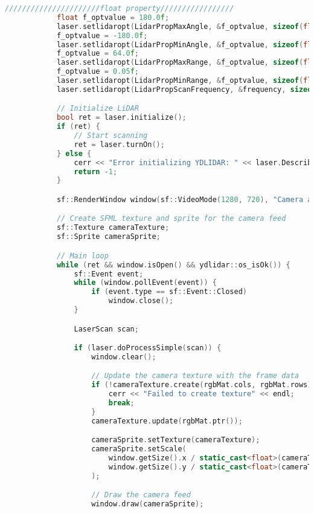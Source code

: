 \begin{lstlisting}[language={C++}, caption={C\'odigo de ejemplo de Kinect y LiDAR}, label={fresd}]
            //////////////////////float property/////////////////
            float f_optvalue = 180.0f;
            laser.setlidaropt(LidarPropMaxAngle, &f_optvalue, sizeof(float));
            f_optvalue = -180.0f;
            laser.setlidaropt(LidarPropMinAngle, &f_optvalue, sizeof(float));
            f_optvalue = 64.0f;
            laser.setlidaropt(LidarPropMaxRange, &f_optvalue, sizeof(float));
            f_optvalue = 0.05f;
            laser.setlidaropt(LidarPropMinRange, &f_optvalue, sizeof(float));
            laser.setlidaropt(LidarPropScanFrequency, &frequency, sizeof(float));

            // Initialize LiDAR
            bool ret = laser.initialize();
            if (ret) {
                // Start scanning
                ret = laser.turnOn();
            } else {
                cerr << "Error initializing YDLIDAR: " << laser.DescribeError() << endl;
                return -1;
            }

            sf::RenderWindow window(sf::VideoMode(1280, 720), "Camera and LiDAR Visualization");

            // Create SFML texture and sprite for the camera feed
            sf::Texture cameraTexture;
            sf::Sprite cameraSprite;

            // Main loop
            while (ret && window.isOpen() && ydlidar::os_isOk()) {
                sf::Event event;
                while (window.pollEvent(event)) {
                    if (event.type == sf::Event::Closed)
                        window.close();
                }

                LaserScan scan;

                if (laser.doProcessSimple(scan)) {
                    window.clear();

                    // Update the camera texture with the frame data
                    if (!cameraTexture.create(rgbMat.cols, rgbMat.rows)) {
                        cerr << "Failed to create texture" << endl;
                        break;
                    }
                    cameraTexture.update(rgbMat.ptr());

                    cameraSprite.setTexture(cameraTexture);
                    cameraSprite.setScale(
                        window.getSize().x / static_cast<float>(cameraTexture.getSize().x),
                        window.getSize().y / static_cast<float>(cameraTexture.getSize().y)
                    );

                    // Draw the camera feed
                    window.draw(cameraSprite);


\end{lstlisting}
